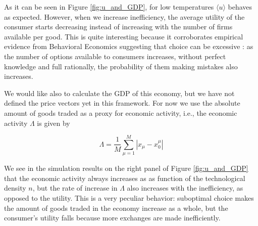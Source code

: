 As it can be seen in Figure \ref{fig:u_and_GDP}, for low temperatures
$\langle u \rangle$ behaves as expected. However, when we increase inefficiency, the average utility of the consumer starts
decreasing instead of increasing with the number of firms available
per good. This is quite interesting because it corroborates
empirical evidence from Behavioral Economics suggesting that choice can be excessive \cite{Lepper00, Schwartz02}: as the number of
options available to consumers increases, without perfect knowledge
and full rationally, the probability of them making mistakes also
increases.

We would like also to calculate the GDP of this economy, but we have
not defined the price vectors yet in this framework. For now we use the absolute amount of goods traded as a
proxy for economic activity, i.e., the economic activity $\Lambda$ is
given by

\begin{equation}
  \label{eq:inef_6}
  \Lambda = \frac{1}{M} \sum_{\mu = 1}^M \left| x_\mu - x_0^\mu \right|
\end{equation}

We see in the simulation results on the right panel of Figure \ref{fig:u_and_GDP} that
the economic activity always increases as as function of the
technological density $n$, but the rate of increase in $\Lambda$ also
increases with the inefficiency, as opposed to the utility. This is a
very peculiar behavior: suboptimal choice makes the amount of goods
traded in the economy increase as a whole, but the consumer's utility falls
because more exchanges are made inefficiently.


